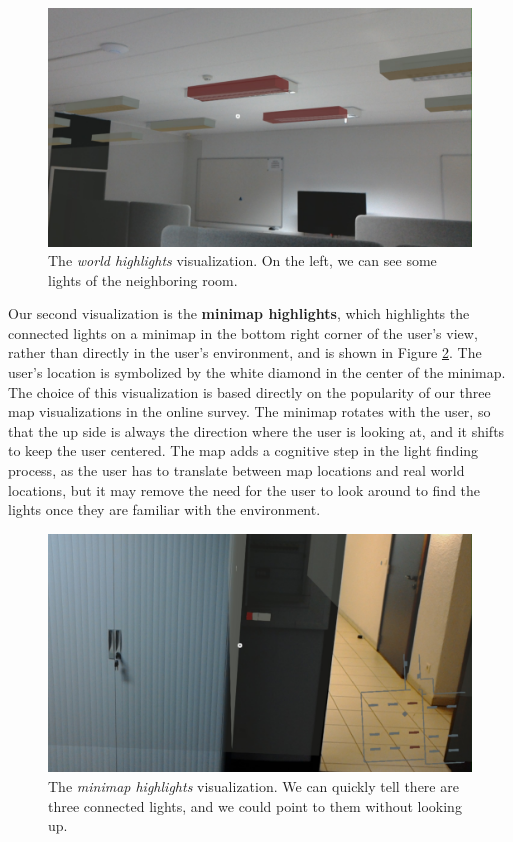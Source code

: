 \begin{figure}
    \centering
    \includegraphics[width=1.0\linewidth]{resources/implementation/world_highlights.jpg}
    \caption{The \textit{world highlights} visualization. On the left, we can see some lights of the neighboring room.}
    \label{fig:world_highlights_vis}
\end{figure}

Our second visualization is the \textbf{minimap highlights}, which highlights the connected lights on a minimap in the bottom right corner of the user's view, rather than directly in the user's environment, and is shown in Figure \ref{fig:minimap_highlights_vis}. The user's location is symbolized by the white diamond in the center of the minimap. The choice of this visualization is based directly on the popularity of our three map visualizations in the online survey. The minimap rotates with the user, so that the up side is always the direction where the user is looking at, and it shifts to keep the user centered. The map adds a cognitive step in the light finding process, as the user has to translate between map locations and real world locations, but it may remove the need for the user to look around to find the lights once they are familiar with the environment.

\begin{figure}
    \centering
    \includegraphics[width=1.0\linewidth]{resources/implementation/minimap_highlights.jpg}
    \caption{The \textit{minimap highlights} visualization. We can quickly tell there are three connected lights, and we could point to them without looking up.}
    \label{fig:minimap_highlights_vis}
\end{figure}


